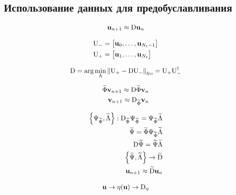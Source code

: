 \subsection{Использование данных для предобуславливания}

\begin{equation}
    \unk_{n+1} \approx \matr{D} \unk_{n}
\end{equation}

\begin{align}
    \matr{U}_{-} &=
    \begin{bmatrix}
        \unk_0, \dots, \unk_{N_t-1}
    \end{bmatrix}\\
    \matr{U}_{+} &=
    \begin{bmatrix}
        \unk_1, \dots, \unk_{N_t}
    \end{bmatrix}
\end{align}

\begin{align}
    \matr{D} = \arg \min_{\matr{A}} \norm[\text{fro}]{\matr{U}_{+} - \matr{D} \matr{U}_{-}} = \matr{U}_{+} \matr{U}_{-}^{\dagger}
\end{align}

\begin{align}
    \widetilde{\Phi} \vunk_{n+1} \approx  \matr{D} \widetilde{\Phi} \vunk_{n} \\
    \vunk_{n+1} \approx  \matr{D}_{\widetilde{\Phi}} \vunk_{n} \\
\end{align}

\begin{align}
    \left\{ \Psi_{\widetilde{\Phi}},  \widetilde{\Lambda} \right\} : \matr{D}_{\widetilde{\Phi}}  \Psi_{\widetilde{\Phi}} = \Psi_{\widetilde{\Phi}} \widetilde{\Lambda} \\
    \widetilde{\Psi} = \widetilde{\Phi} \Psi_{\widetilde{\Phi}} \widetilde{\Lambda} \\
    \matr{D} \widetilde{\Psi} = \widetilde{\Psi}\widetilde{\Lambda} \\
    \left\{\widetilde{\Psi},  \widetilde{\Lambda} \right\} \rightarrow \widetilde{\matr{D}}\\
    \unk_{n+1} \approx \widetilde{\matr{D}} \unk_{n}
\end{align}

\begin{align}
   \unk \rightarrow \nlin(\unk) \rightarrow \matr{D}_{\nlin}
\end{align}

